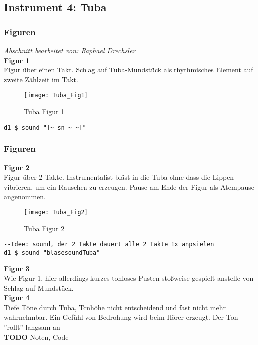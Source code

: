 \documentclass[
10pt, %
a4paper, %
oneside, %
headinclude,footinclude, %
BCOR5mm, %
]{scrartcl}
\begin{document}
\subsection{Instrument 4: Tuba}
\subsubsection{Figuren}
\textit{Abschnitt bearbeitet von: Raphael Drechsler}\\

\noindent\textbf{Figur 1}\\
Figur über einen Takt. Schlag auf Tuba-Mundstück als rhythmisches Element auf zweite Zählzeit im Takt.\\
\begin{figure}[h]
	\centering 
	\texttt{[image: Tuba\_Fig1]} 
	\caption{Tuba Figur 1}
\end{figure}

\begin{lstlisting}
d1 $ sound "[~ sn ~ ~]"
\end{lstlisting}

\subsubsection{Figuren}
\textbf{Figur 2}\\
Figur über 2 Takte. Instrumentalist bläst in die Tuba ohne dass die Lippen vibrieren, um ein Rauschen zu erzeugen. Pause am Ende der Figur als Atempause angenommen. 

\begin{figure}[h]
	\centering 
	\texttt{[image: Tuba\_Fig2]} 
	\caption{Tuba Figur 2}
\end{figure}

\begin{lstlisting}
--Idee: sound, der 2 Takte dauert alle 2 Takte 1x anpsielen
d1 $ sound "blasesoundTuba"
\end{lstlisting}

\noindent\textbf{Figur 3}\\
Wie Figur 1, hier allerdings kurzes tonloses Pusten stoßweise gespielt anstelle von Schlag auf Mundstück.\\

\noindent\textbf{Figur 4}\\
Tiefe Töne durch Tuba, Tonhöhe nicht entscheidend und fast nicht mehr wahrnehmbar. Ein Gefühl von Bedrohung wird beim Hörer erzeugt. Der Ton ''rollt'' langsam an\\
{\color{red}\textbf{TODO}} Noten, Code\\
\end{document}
